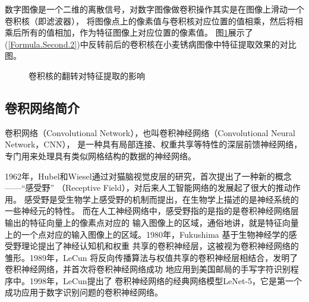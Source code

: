   数字图像是一个二维的离散信号，对数字图像做卷积操作其实是在图像上滑动一个卷积核（即滤波器），
  将图像点上的像素值与卷积核对应位置的值相乘，然后将相乘后所有的值相加，作为特征图像上对应位置的像素值。
  图\ref{Figure.Second.1}展示了(\ref{Formula.Second.2})中反转前后的卷积核在小麦锈病图像中特征提取效果的对比图。
  \begin{figure}[H]
    \centering %
    \caption{卷积核的翻转对特征提取的影响}
    \label{Figure.Second.1}
  \end{figure}
  

  
  \subsection{\hei\xiaosan\textbf{卷积网络简介}}
    卷积网络（Convolutional Network），也叫卷积神经网络（Convolutional Neural Network，CNN），
    是一种具有局部连接、权重共享等特性的深层前馈神经网络，专门用来处理具有类似网格结构的数据的神经网络。
    

    1962年，Hubel和Wiesel通过对猫脑视觉皮层的研究，首次提出了一种新的概念——“感受野”
    （Receptive Field），对后来人工智能网络的发展起了很大的推动作用\cite{hubel1962receptive}。
    感受野是受生物学上感受野的机制而提出，在生物学上描述的是神经系统的一些神经元的特性。
    而在人工神经网络中，感受野指的是指的是卷积神经网络层输出的特征向量上的像素点对应的
    输入图像上的区域，通俗地讲，就是特征向量上的一个点对应的输入图像上的区域。1980年，Fukushima
    \cite{fukushima1982neocognitron}基于生物神经学的感受野理论提出了神经认知机和权重
    共享的卷积神经层，这被视为卷积神经网络的雏形。1989年，LeCun\cite{lecun1989backpropagation}
    将反向传播算法与权值共享的卷积神经层相结合，发明了卷积神经网络，并首次将卷积神经网络成功
    地应用到美国邮局的手写字符识别程序中。1998年，LeCun\cite{lecun1998gradient}提出了
    卷积神经网络的经典网络模型LeNet-5，它是第一个成功应用于数字\zerospace 识别问题的卷积神经网络。
    
